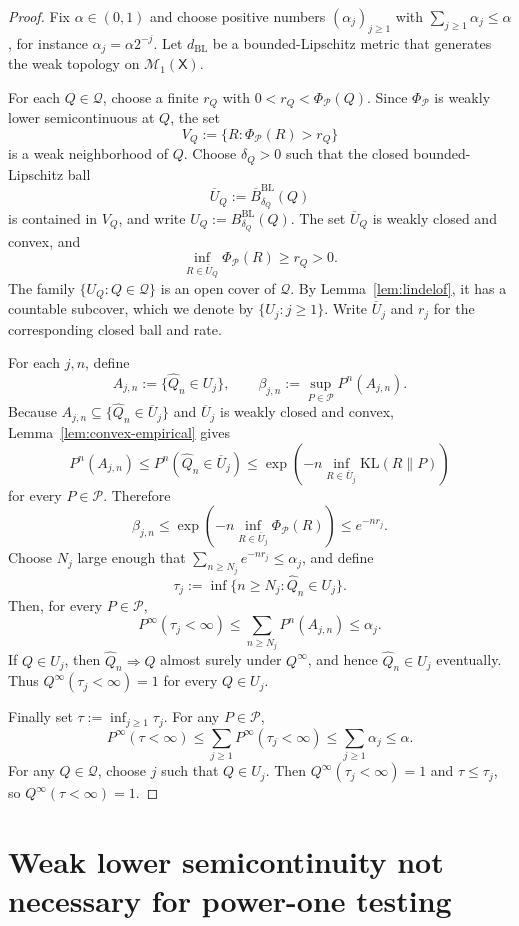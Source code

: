 \documentclass[11pt]{article}
\newcommand{\KL}{\mathrm{KL}}
\newcommand{\Pcal}{\mathcal{P}}
\newcommand{\Qcal}{\mathcal{Q}}
\newcommand{\X}{\mathsf{X}}
\theoremstyle{definition}
\theoremstyle{definition}
\begin{document}
\begin{proof}
Fix $\alpha\in(0,1)$ and choose positive numbers $(\alpha_j)_{j\ge1}$ with $\sum_{j\ge1}\alpha_j\le\alpha$, for instance $\alpha_j=\alpha2^{-j}$.  Let $d_{\mathrm{BL}}$ be a bounded-Lipschitz metric that generates the weak topology on $\mathcal M_1(\X)$.

For each $Q\in\Qcal$, choose a finite $r_Q$ with $0<r_Q<\Phi_\Pcal(Q)$.  Since $\Phi_\Pcal$ is weakly lower semicontinuous at $Q$, the set
\[
  V_Q:=\{R:\Phi_\Pcal(R)>r_Q\}
\]
is a weak neighborhood of $Q$.  Choose $\delta_Q>0$ such that the closed bounded-Lipschitz ball
\[
  \overline U_Q:=\overline B^{\mathrm{BL}}_{\delta_Q}(Q)
\]
is contained in $V_Q$, and write $U_Q:=B^{\mathrm{BL}}_{\delta_Q}(Q)$.  The set $\overline U_Q$ is weakly closed and convex, and
\[
  \inf_{R\in\overline U_Q}\Phi_\Pcal(R)\ge r_Q>0.
\]
The family $\{U_Q:Q\in\Qcal\}$ is an open cover of $\Qcal$.  By Lemma~\ref{lem:lindelof}, it has a countable subcover, which we denote by $\{U_j:j\ge1\}$.  Write $\overline U_j$ and $r_j$ for the corresponding closed ball and rate.

For each $j,n$, define
\[
  A_{j,n}:=\{\widehat Q_n\in U_j\},
  \qquad
  \beta_{j,n}:=\sup_{P\in\Pcal}P^n(A_{j,n}).
\]
Because $A_{j,n}\subseteq\{\widehat Q_n\in\overline U_j\}$ and $\overline U_j$ is weakly closed and convex, Lemma~\ref{lem:convex-empirical} gives
\[
  P^n(A_{j,n})
  \le P^n(\widehat Q_n\in\overline U_j)
  \le \exp\left(-n\inf_{R\in\overline U_j}\KL(R\|P)\right)
\]
for every $P\in\Pcal$.  Therefore
\[
  \beta_{j,n}
  \le \exp\left(-n\inf_{R\in\overline U_j}\Phi_\Pcal(R)\right)
  \le e^{-nr_j}.
\]
Choose $N_j$ large enough that $\sum_{n\ge N_j}e^{-nr_j}\le\alpha_j$, and define
\[
  \tau_j:=\inf\{n\ge N_j:\widehat Q_n\in U_j\}.
\]
Then, for every $P\in\Pcal$,
\[
  P^\infty(\tau_j<\infty)
  \le \sum_{n\ge N_j}P^n(A_{j,n})
  \le \alpha_j.
\]
If $Q\in U_j$, then $\widehat Q_n\Rightarrow Q$ almost surely under $Q^\infty$, and hence $\widehat Q_n\in U_j$ eventually.  Thus $Q^\infty(\tau_j<\infty)=1$ for every $Q\in U_j$.

Finally set $\tau:=\inf_{j\ge1}\tau_j$.  For any $P\in\Pcal$,
\[
  P^\infty(\tau<\infty)
  \le \sum_{j\ge1}P^\infty(\tau_j<\infty)
  \le \sum_{j\ge1}\alpha_j
  \le\alpha.
\]
For any $Q\in\Qcal$, choose $j$ such that $Q\in U_j$.  Then $Q^\infty(\tau_j<\infty)=1$ and $\tau\le\tau_j$, so $Q^\infty(\tau<\infty)=1$.
\end{proof}


\noindent 
\section{Weak lower semicontinuity not necessary for power-one testing}\label{sec:notnec}
\end{document}
